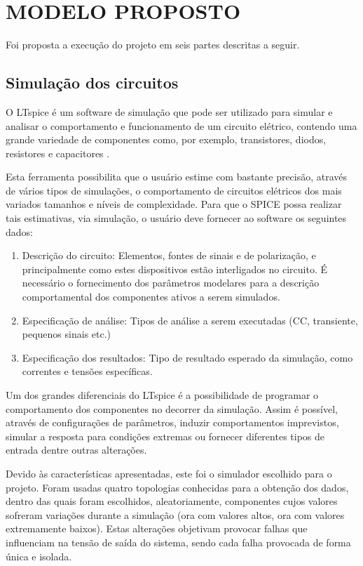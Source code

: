 \chapter{MODELO PROPOSTO}

Foi proposta a execução do projeto em seis partes descritas a seguir. 

\section{\textbf{Simulação dos circuitos}}

O LTspice é um software de simulação que pode ser utilizado para simular e analisar o comportamento e funcionamento de um circuito elétrico, contendo uma grande variedade de componentes  como, por exemplo, transistores, diodos, resistores e capacitores \cite{Spice}.

Esta ferramenta possibilita que o usuário estime com bastante precisão, através de vários tipos de simulações, o comportamento de circuitos elétricos dos mais variados tamanhos e níveis de complexidade.
Para que o SPICE possa realizar tais estimativas, via simulação, o usuário deve fornecer ao software os seguintes dados\cite{LTSpice}:
\renewcommand{\theenumi}{\Alph{enumi}}
 \begin{enumerate}
\item  Descrição do circuito: Elementos, fontes de sinais e de polarização, e principalmente como estes dispositivos estão interligados no circuito. É necessário o fornecimento dos parâmetros modelares para a descrição comportamental dos componentes ativos a serem simulados.

\item  Especificação de análise: Tipos de análise a serem executadas (CC, transiente, pequenos sinais etc.)

\item  Especificação dos resultados: Tipo de resultado esperado da simulação, como correntes e tensões específicas.
\end{enumerate}

Um dos grandes diferenciais do LTspice é a possibilidade de programar o comportamento dos componentes no decorrer da simulação. Assim é possível, através de configurações de parâmetros, induzir comportamentos imprevistos, simular a resposta para condições extremas ou fornecer diferentes tipos de entrada dentre outras alterações. 

Devido às características apresentadas, este  foi o simulador escolhido para o projeto. Foram usadas quatro topologias conhecidas para a obtenção dos dados, dentro das quais foram escolhidos, aleatoriamente, componentes cujos valores sofreram variações durante a simulação (ora com valores altos, ora com valores extremamente baixos). Estas alterações objetivam provocar falhas que influenciam na tensão de saída do sistema, sendo cada falha provocada de forma única e isolada. 


